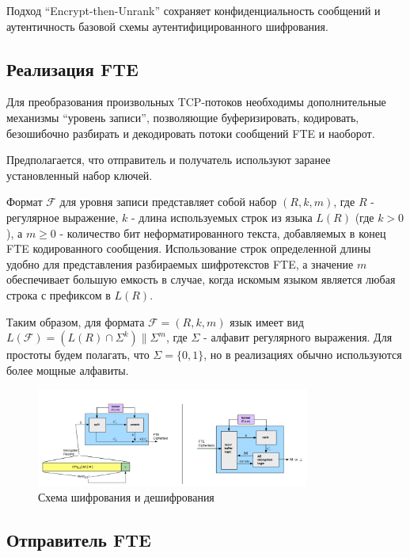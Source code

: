 Подход ``Encrypt-then-Unrank'' сохраняет конфиденциальность сообщений и аутентичность базовой схемы аутентифицированного шифрования.


\subsection{Реализация FTE}

Для преобразования произвольных TCP-потоков необходимы дополнительные механизмы ``уровень записи'',
позволяющие буферизировать, кодировать, безошибочно разбирать и декодировать потоки сообщений FTE и наоборот.

Предполагается, что отправитель и получатель используют заранее установленный набор ключей.

Формат $\mathcal{F}$ для уровня записи представляет собой набор $(R, k, m)$, где $R$ - регулярное выражение,
$k$ - длина используемых строк из языка $L(R)$ (где $k > 0$), а $m \geq 0$ - количество бит неформатированного текста,
добавляемых в конец FTE кодированного сообщения. Использование строк определенной длины удобно для представления разбираемых шифротекстов FTE,
а значение $m$ обеспечивает большую емкость в случае, когда искомым языком является любая строка с префиксом в $L(R)$.

Таким образом, для формата $\mathcal{F} = (R, k, m)$ язык имеет вид $L(\mathcal{F}) = (L(R) \cap \Sigma^k) \| \Sigma^m$, где $\Sigma$ - алфавит регулярного выражения.
Для простоты будем полагать, что $\Sigma = \{0, 1\}$, но в реализациях обычно используются более мощные алфавиты.

\begin{figure}[h!]
    \begin{center}
        \includegraphics[width = 0.8\textwidth]{FTE_record_layer.png}
        \caption{Схема шифрования и дешифрования}
    \end{center}
\end{figure}

\subsection{Отправитель FTE}

